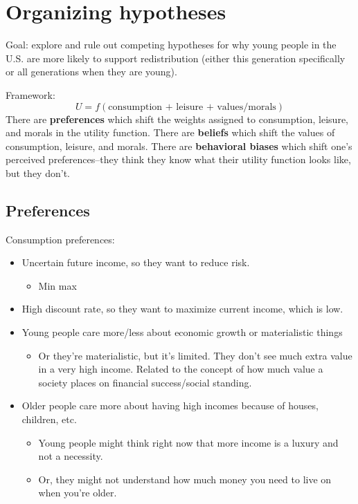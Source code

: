 \documentclass[12pt]{article}
\begin{document}
\section*{Organizing hypotheses}

    Goal: explore and rule out competing hypotheses for why young people in the U.S. are more likely to support redistribution (either this generation specifically or all generations when they are young). 

    Framework: 
    \begin{equation*}
        U = f(\text{consumption + leisure + values/morals})
    \end{equation*}
    There are \textbf{preferences} which shift the weights assigned to consumption, leisure, and morals in the utility function. There are \textbf{beliefs} which shift the values of consumption, leisure, and morals. There are \textbf{behavioral biases} which shift one's perceived preferences--they think they know what their utility function looks like, but they don't. 

    \subsection*{Preferences}

    Consumption preferences:
    \begin{itemize}
        \item Uncertain future income, so they want to reduce risk.
        \begin{itemize}
            \item Min max
        \end{itemize}
        \item High discount rate, so they want to maximize current income, which is low.
        \item Young people care more/less about economic growth or materialistic things
        \begin{itemize}
            \item Or they're materialistic, but it's limited. They don't see much extra value in a very high income. Related to the concept of how much value a society places on financial success/social standing.
        \end{itemize}
        \item Older people care more about having high incomes because of houses, children, etc.
        \begin{itemize}
            \item Young people might think right now that more income is a luxury and not a necessity.
            \item Or, they might not understand how much money you need to live on when you're older.
        \end{itemize}
    \end{itemize}
\end{document}
